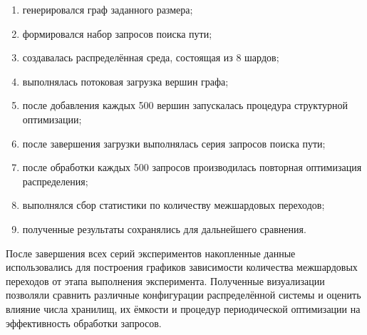 \begin{enumerate}
\item генерировался граф заданного размера;
\item формировался набор запросов поиска пути;
\item создавалась распределённая среда, состоящая из 8 шардов;
\item выполнялась потоковая загрузка вершин графа;
\item после добавления каждых 500 вершин запускалась процедура структурной оптимизации;
\item после завершения загрузки выполнялась серия запросов поиска пути;
\item после обработки каждых 500 запросов производилась повторная оптимизация распределения;
\item выполнялся сбор статистики по количеству межшардовых переходов;
\item полученные результаты сохранялись для дальнейшего сравнения.
\end{enumerate}

После завершения всех серий экспериментов накопленные данные использовались для построения графиков зависимости количества межшардовых переходов от этапа выполнения эксперимента. Полученные визуализации позволяли сравнить различные конфигурации распределённой системы и оценить влияние числа хранилищ, их ёмкости и процедур периодической оптимизации на эффективность обработки запросов.



